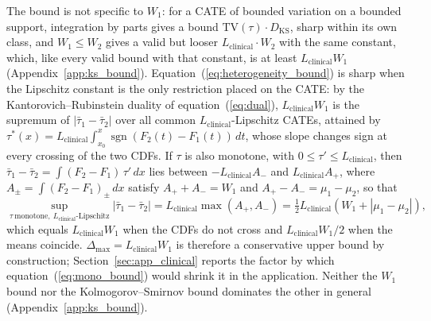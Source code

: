 \documentclass[AMA,Times1COL]{WileyNJDv5}
\begin{document}
The bound is not specific to $W_1$: for a CATE of bounded variation on a bounded support, integration by parts gives a bound $\mathrm{TV}(\tau) \cdot D_{\text{KS}}$, sharp within its own class, and $W_1 \leq W_2$ gives a valid but looser $L_{\text{clinical}} \cdot W_2$ with the same constant, which, like every valid bound with that constant, is at least $L_{\text{clinical}} W_1$ (Appendix~\ref{app:ks_bound}).\cite{villani2009} Equation~(\ref{eq:heterogeneity_bound}) is sharp when the Lipschitz constant is the only restriction placed on the CATE: by the Kantorovich--Rubinstein duality of equation~(\ref{eq:dual}), $L_{\text{clinical}} W_1$ is the supremum of $|\bar{\tau}_1 - \bar{\tau}_2|$ over all common $L_{\text{clinical}}$-Lipschitz CATEs, attained by $\tau^*(x) = L_{\text{clinical}} \int_{x_0}^{x} \operatorname{sgn}(F_2(t) - F_1(t))\,dt$, whose slope changes sign at every crossing of the two CDFs. If $\tau$ is also monotone, with $0 \leq \tau' \leq L_{\text{clinical}}$, then $\bar{\tau}_1 - \bar{\tau}_2 = \int (F_2 - F_1)\,\tau'\,dx$ lies between $-L_{\text{clinical}} A_-$ and $L_{\text{clinical}} A_+$, where $A_\pm = \int (F_2 - F_1)_\pm\,dx$ satisfy $A_+ + A_- = W_1$ and $A_+ - A_- = \mu_1 - \mu_2$, so that
\begin{equation}
\sup_{\tau\ \text{monotone},\ L_{\text{clinical}}\text{-Lipschitz}} |\bar{\tau}_1 - \bar{\tau}_2| = L_{\text{clinical}} \max(A_+, A_-) = \tfrac{1}{2} L_{\text{clinical}} \left( W_1 + |\mu_1 - \mu_2| \right),
\label{eq:mono_bound}
\end{equation}
which equals $L_{\text{clinical}} W_1$ when the CDFs do not cross and $L_{\text{clinical}} W_1 / 2$ when the means coincide. $\Delta_{\max} = L_{\text{clinical}} W_1$ is therefore a conservative upper bound by construction; Section~\ref{sec:app_clinical} reports the factor by which equation~(\ref{eq:mono_bound}) would shrink it in the application. Neither the $W_1$ bound nor the Kolmogorov--Smirnov bound dominates the other in general (Appendix~\ref{app:ks_bound}).
\end{document}
